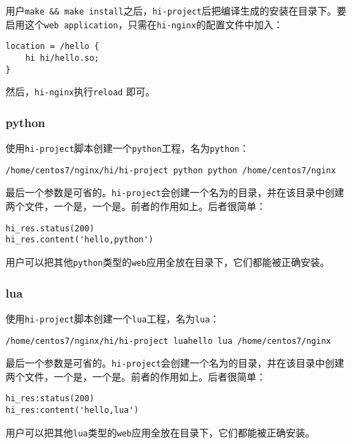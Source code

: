 用户\texttt{make \&\& make install}之后，\texttt{hi-project}后把编译生成的安装在目录下。要启用这个\texttt{web application}，只需在\texttt{hi-nginx}的配置文件中加入：
\begin{lstlisting}
location = /hello {
	hi hi/hello.so;
}
\end{lstlisting}
然后，\texttt{hi-nginx}执行\texttt{reload} 即可。


\subsubsection{python}
使用\texttt{hi-project}脚本创建一个\texttt{python}工程，名为\texttt{python}：
\begin{lstlisting}
/home/centos7/nginx/hi/hi-project python python /home/centos7/nginx
\end{lstlisting}
最后一个参数是可省的。\texttt{hi-project}会创建一个名为的目录，并在该目录中创建两个文件，一个是，一个是。前者的作用如上。后者很简单：
\begin{lstlisting}
hi_res.status(200)
hi_res.content('hello,python')
\end{lstlisting}
用户可以把其他\texttt{python}类型的\texttt{web}应用全放在目录下，它们都能被正确安装。

\subsubsection{lua}
使用\texttt{hi-project}脚本创建一个\texttt{lua}工程，名为\texttt{lua}：
\begin{lstlisting}
/home/centos7/nginx/hi/hi-project luahello lua /home/centos7/nginx
\end{lstlisting}
最后一个参数是可省的。\texttt{hi-project}会创建一个名为的目录，并在该目录中创建两个文件，一个是，一个是。前者的作用如上。后者很简单：
\begin{lstlisting}
hi_res:status(200)
hi_res:content('hello,lua')
\end{lstlisting}
用户可以把其他\texttt{lua}类型的\texttt{web}应用全放在目录下，它们都能被正确安装。

